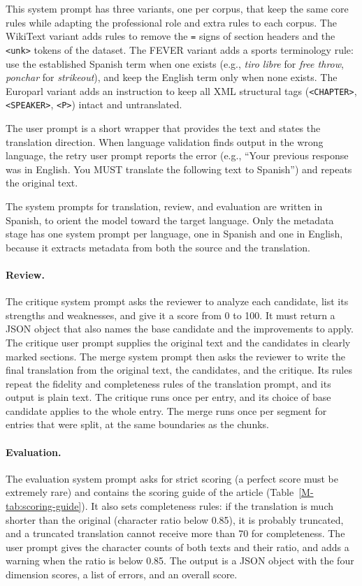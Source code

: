 \documentclass[11pt]{article}
\DeclareRobustCommand{\mainref}[1]{\ref*{M-#1}}
\begin{document}
This system prompt has three variants, one per corpus, that keep the same core rules while adapting the professional role and extra rules to each corpus. The WikiText variant adds rules to remove the \texttt{=} signs of section headers and the \texttt{<unk>} tokens of the dataset. The FEVER variant adds a sports terminology rule: use the established Spanish term when one exists (e.g., \emph{tiro libre} for \emph{free throw}, \emph{ponchar} for \emph{strikeout}), and keep the English term only when none exists. The Europarl variant adds an instruction to keep all XML structural tags (\texttt{<CHAPTER>}, \texttt{<SPEAKER>}, \texttt{<P>}) intact and untranslated.

The user prompt is a short wrapper that provides the text and states the translation direction. When language validation finds output in the wrong language, the retry user prompt reports the error (e.g., ``Your previous response was in English. You MUST translate the following text to Spanish'') and repeats the original text.

The system prompts for translation, review, and evaluation are written in Spanish, to orient the model toward the target language. Only the metadata stage has one system prompt per language, one in Spanish and one in English, because it extracts metadata from both the source and the translation.

\paragraph{Review.} The critique system prompt asks the reviewer to analyze each candidate, list its strengths and weaknesses, and give it a score from 0 to 100. It must return a JSON object that also names the base candidate and the improvements to apply. The critique user prompt supplies the original text and the candidates in clearly marked sections. The merge system prompt then asks the reviewer to write the final translation from the original text, the candidates, and the critique. Its rules repeat the fidelity and completeness rules of the translation prompt, and its output is plain text. The critique runs once per entry, and its choice of base candidate applies to the whole entry. The merge runs once per segment for entries that were split, at the same boundaries as the chunks.

\paragraph{Evaluation.} The evaluation system prompt asks for strict scoring (a perfect score must be extremely rare) and contains the scoring guide of the article (Table~\mainref{tab:scoring-guide}). It also sets completeness rules: if the translation is much shorter than the original (character ratio below 0.85), it is probably truncated, and a truncated translation cannot receive more than 70 for completeness. The user prompt gives the character counts of both texts and their ratio, and adds a warning when the ratio is below 0.85. The output is a JSON object with the four dimension scores, a list of errors, and an overall score.
\end{document}
